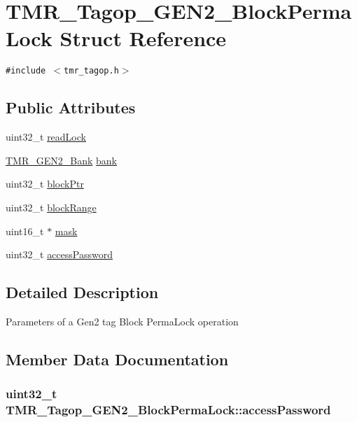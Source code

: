 \hypertarget{struct_t_m_r___tagop___g_e_n2___block_perma_lock}{
\section{TMR\_\-Tagop\_\-GEN2\_\-BlockPermaLock Struct Reference}
\label{struct_t_m_r___tagop___g_e_n2___block_perma_lock}
}
{\tt \#include $<$tmr\_\-tagop.h$>$}

\subsection*{Public Attributes}
\begin{CompactItemize}
\item 
uint32\_\-t \hyperlink{struct_t_m_r___tagop___g_e_n2___block_perma_lock_8b72f2a7c57cc5a375c2c56cca086097}{readLock}
\item 
\hyperlink{tmr__gen2_8h_0037d967117e4d1fb33a75ef09a81b03}{TMR\_\-GEN2\_\-Bank} \hyperlink{struct_t_m_r___tagop___g_e_n2___block_perma_lock_294a9e65e0a8ba916041a3a9a1c647b3}{bank}
\item 
uint32\_\-t \hyperlink{struct_t_m_r___tagop___g_e_n2___block_perma_lock_3c0aa3e5175b38845cff4fa2e332ce45}{blockPtr}
\item 
uint32\_\-t \hyperlink{struct_t_m_r___tagop___g_e_n2___block_perma_lock_d70ba97cc189d8945fd037625bfdb3fc}{blockRange}
\item 
uint16\_\-t $\ast$ \hyperlink{struct_t_m_r___tagop___g_e_n2___block_perma_lock_1efb4e5a091e963605b860c187ece0d8}{mask}
\item 
uint32\_\-t \hyperlink{struct_t_m_r___tagop___g_e_n2___block_perma_lock_1c33ee3c7f89ed5aa635e731c83339d8}{accessPassword}
\end{CompactItemize}


\subsection{Detailed Description}
Parameters of a Gen2 tag Block PermaLock operation 

\subsection{Member Data Documentation}
\hypertarget{struct_t_m_r___tagop___g_e_n2___block_perma_lock_1c33ee3c7f89ed5aa635e731c83339d8}{
\subsubsection[{accessPassword}]{\setlength{\rightskip}{0pt plus 5cm}uint32\_\-t {\bf TMR\_\-Tagop\_\-GEN2\_\-BlockPermaLock::accessPassword}}}
\label{struct_t_m_r___tagop___g_e_n2___block_perma_lock_1c33ee3c7f89ed5aa635e731c83339d8}



